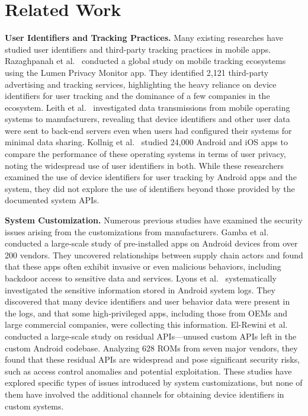 \section{Related Work}
\label{sec:related}


\noindent \textbf{User Identifiers and Tracking Practices.}
Many existing researches have studied user identifiers and third-party tracking practices in mobile apps.
Razaghpanah et al.~\cite{razaghpanah2018apps} conducted a global study on mobile tracking ecosystems using the Lumen Privacy Monitor app. 
They identified 2,121 third-party advertising and tracking services, highlighting the heavy reliance on device identifiers for user tracking and the dominance of a few companies in the ecosystem.
Leith et al.~\cite{leith2021mobile} investigated data transmissions from mobile operating systems to manufacturers, revealing that device identifiers and other user data were sent to back-end servers even when users had configured their systems for minimal data sharing.
Kollnig et al.~\cite{kollnig2022iphones} studied 24,000 Android and iOS apps to compare the performance of these operating systems in terms of user privacy, noting the widespread use of user identifiers in both.
While these researchers examined the use of device identifiers for user tracking by Android apps and the system, they did not explore the use of identifiers beyond those provided by the documented system APIs.

\noindent \textbf{System Customization.}
Numerous previous studies have examined the security issues arising from the customizations from manufacturers.
Gamba et al.~\cite{gamba2020analysis} conducted a large-scale study of pre-installed apps on Android devices from over 200 vendors. 
They uncovered relationships between supply chain actors and found that these apps often exhibit invasive or even malicious behaviors, including backdoor access to sensitive data and services.
Lyons et al.~\cite{lyons2023log} systematically investigated the sensitive information stored in Android system logs. 
They discovered that many device identifiers and user behavior data were present in the logs, and that some high-privileged apps, including those from OEMs and large commercial companies, were collecting this information.
El-Rewini et al.~\cite{el2021dissecting} conducted a large-scale study on residual APIs—unused custom APIs left in the custom Android codebase. 
Analyzing 628 ROMs from seven major vendors, they found that these residual APIs are widespread and pose significant security risks, such as access control anomalies and potential exploitation.
These studies have explored specific types of issues introduced by system customizations, but none of them have involved the additional channels for obtaining device identifiers in custom systems.

